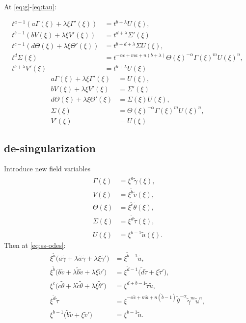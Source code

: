 \documentclass[a4paper,11pt]{article}
\def\tg{{\tilde{\gamma}}}
\def\tv{{\tilde{v}}}
\def\tth{{\tilde{\theta}}}
\def\ts{{\tilde{\tau}}}
\def\tu{{\tilde{u}}}
\def\ta{{\tilde{a}}}
\def\tb{{\tilde{b}}}
\def\tc{{\tilde{c}}}
\def\td{{\tilde{d}}}
\begin{document}
At \eqref{eq:g}-\eqref{eq:tau}:

\begin{align*}
 t^{a-1}(a \Gamma(\xi) + \lambda \xi \Gamma'(\xi)) &= t^{b+ \lambda} U(\xi),\\
 t^{b-1}(b V(\xi) + \lambda \xi V'(\xi)) &= t^{d+ \lambda} \Sigma'(\xi)\\
 t^{c-1}(d \Theta(\xi) + \lambda \xi \Theta'(\xi))&=t^{b+d+\lambda} \Sigma U(\xi),\\
 t^d\Sigma(\xi) &= t^{-\alpha c +ma +n(b+ \lambda)} \Theta(\xi)^{-\alpha} \Gamma(\xi)^m U(\xi)^n,\\
 t^{b+\lambda}V'(\xi)&=t^{b+\lambda}U(\xi)
\end{align*}
\begin{equation}
\begin{aligned}
 a \Gamma(\xi) + \lambda \xi \Gamma'(\xi) &= U(\xi),\\
 b V(\xi) + \lambda \xi V'(\xi) &= \Sigma'(\xi)\\
 d \Theta(\xi) + \lambda \xi \Theta'(\xi)&=\Sigma(\xi) U(\xi),\\
 \Sigma(\xi) &= \Theta(\xi)^{-\alpha} \Gamma(\xi)^m U(\xi)^n,\\
 V'(\xi)&=U(\xi)
\end{aligned} \label{eq:ss-odes}
\end{equation}
\subsection{de-singularization}
Introduce new field variables 
\begin{equation}
\begin{aligned}
 \Gamma(\xi) &= \xi^\ta \tg(\xi),\\
 V(\xi)&=\xi^\tb \tv(\xi),\\
 \Theta(\xi)&=\xi^\tc \tth(\xi),\\
 \Sigma(\xi)&=\xi^\td \ts(\xi),\\
 U(\xi)&=\xi^{\tb-1} \tu(\xi). 
\end{aligned}
\end{equation}
Then at \eqref{eq:ss-odes}:
\begin{align*}
 \xi^\ta\Big( a\tg + \lambda \ta \tg + \lambda\xi\tg'\Big) &=\xi^{\tb-1} \tu,\\
 \xi^\tb\Big( b\tv + \lambda \tb \tv + \lambda\xi\tv'\Big) &=\xi^{\td-1} \Big(\td\ts + \xi\ts'\Big),\\
 \xi^\tc\Big( c\tth+ \lambda \tc \tth+ \lambda\xi\tth'\Big)&=\xi^{\td+\tb-1} \ts\tu,\\
 \xi^\td\ts &= \xi^{-\alpha \tc +m\ta +n(\tb-1)} \tth^{-\alpha} \tg^m \tu^n,\\
 \xi^{\tb-1}\Big(\tb\tv + \xi \tv'\Big)&= \xi^{\tb-1} \tu.
\end{align*}
\end{document}
